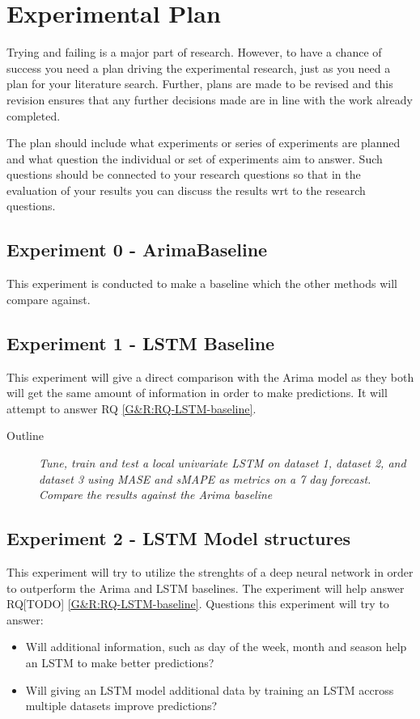 
\section{Experimental Plan}
\label{sec:experimentalPlan}

Trying and failing is a major part of research. However, to have a chance of success you need a plan driving the experimental research, just as you need a plan for your literature search. Further, plans are made to be revised and this revision ensures that any further decisions made are in line with the work already completed.

The plan should include what experiments or series of experiments are planned and what question the individual or set of experiments aim to answer. Such questions should be connected to your research questions so that in the evaluation of your results you can discuss the results wrt to the research questions.


\subsection{Experiment 0 - ArimaBaseline}
This experiment is conducted to make a baseline which the other methods
will compare against.

\subsection{Experiment 1 - LSTM Baseline}
This experiment will give a direct comparison with the Arima model as they both will
get the same amount of information in order to make predictions.
It will attempt to answer RQ \cref{G&R:RQ-LSTM-baseline}.

\begin{description}
  \item[Outline]{\it Tune, train and test a local univariate LSTM on dataset 1,
              dataset 2, and dataset 3 using MASE and sMAPE as metrics on a 7 day forecast. Compare the results against the Arima baseline}
\end{description}

\subsection{Experiment 2 - LSTM Model structures}
This experiment will try to utilize the strenghts of a deep neural network
in order to outperform the Arima and LSTM baselines. The experiment will
help answer RQ[TODO] \cref{G&R:RQ-LSTM-baseline}.
Questions this experiment will try to answer:
\begin{itemize}
  \item Will additional information, such as day of the week, month and season help an LSTM to make better predictions?
  \item {Will giving an LSTM model additional data by training an LSTM accross multiple datasets improve predictions?}
\end{itemize}

